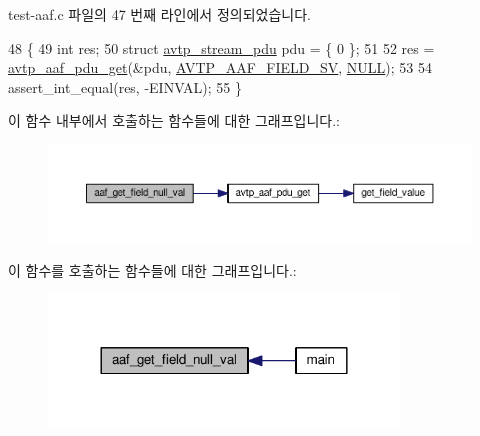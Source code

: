 test-\/aaf.\+c 파일의 47 번째 라인에서 정의되었습니다.


\begin{DoxyCode}
48 \{
49     \textcolor{keywordtype}{int} res;
50     \textcolor{keyword}{struct }\hyperlink{structavtp__stream__pdu}{avtp\_stream\_pdu} pdu = \{ 0 \};
51 
52     res = \hyperlink{avtp__aaf_8h_acc4c927b036e22def8e6b6beb3ac6026}{avtp\_aaf\_pdu\_get}(&pdu, \hyperlink{avtp__aaf_8h_a7eaee6c1ebc806c0401dbe7b14cd22dba77da9ad6a21d2ac376ea286cb2ce6583}{AVTP\_AAF\_FIELD\_SV}, 
      \hyperlink{openavb__types__base__pub_8h_a070d2ce7b6bb7e5c05602aa8c308d0c4}{NULL});
53 
54     assert\_int\_equal(res, -EINVAL);
55 \}
\end{DoxyCode}


이 함수 내부에서 호출하는 함수들에 대한 그래프입니다.\+:
\nopagebreak
\begin{figure}[H]
\begin{center}
\leavevmode
\includegraphics[width=350pt]{test-aaf_8c_a6458b9edde5be98c38e55b696f7040f1_cgraph}
\end{center}
\end{figure}




이 함수를 호출하는 함수들에 대한 그래프입니다.\+:
\nopagebreak
\begin{figure}[H]
\begin{center}
\leavevmode
\includegraphics[width=264pt]{test-aaf_8c_a6458b9edde5be98c38e55b696f7040f1_icgraph}
\end{center}
\end{figure}


